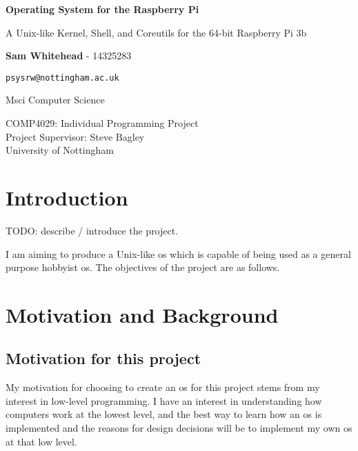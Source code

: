 \documentclass{article}
\begin{document}
\begin{titlepage}
    \begin{center}
        \null\mbox{}\vfill

        \vspace*{1cm}

        \huge
        \textbf{Operating System for the Raspberry Pi}

        \vspace{0.5cm}
        \Large
        A Unix-like Kernel, Shell, and Coreutils for the 64-bit Raspberry Pi 3b

        \Large

        \vspace{1.5cm}

        \textbf{Sam Whitehead} - 14325283

        \texttt{psysrw@nottingham.ac.uk}

        Msci Computer Science

        \vfill

        COMP4029: Individual Programming Project\\
        Project Supervisor: Steve Bagley\\
        University of Nottingham

        \vfill\null
    \end{center}
    \thispagestyle{empty}
\end{titlepage}

\section{Introduction}
TODO: describe / introduce the project.

I am aiming to produce a Unix-like \gls{os} which is capable of being used as a
general purpose hobbyist \gls{os}. The objectives of the project are as
follows.


\section{Motivation and Background}
\subsection*{Motivation for this project}
My motivation for choosing to create an \gls{os} for this project stems from my
interest in low-level programming. I have an interest in understanding how
computers work at the lowest level, and the best way to learn how an \gls{os}
is implemented and the reasons for design decisions will be to implement my own
\gls{os} at that low level.
\end{document}
